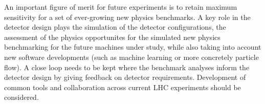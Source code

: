 An important figure of merit for future experiments is to retain maximum sensitivity for a set of ever-growing new physics benchmarks.  A key role in the detector design plays the simulation of the detector configurations, the assessment of the physics opportunites for the simulated new physics benchmarking for the future machines under study, while also taking into account new software developments (such as machine learning or more concretely particle flow).  A close loop needs to be kept where the benchmark analyses inform the detector design by giving feedback on detector requirements.  Development of common tools and collaboration across current LHC experiments should be considered.


